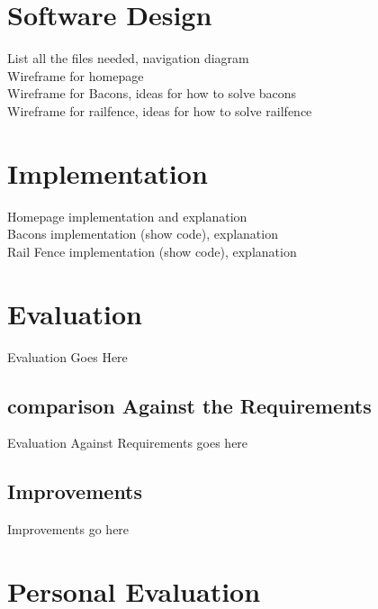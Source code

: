 \documentclass[10pt, a4paper]{article}
\begin{document}
	\section{Software Design}
	List all the files needed, navigation diagram \\ Wireframe for homepage \\ Wireframe for Bacons, ideas for how to solve bacons \\ Wireframe for railfence, ideas for how to solve railfence
	
	
	\section{Implementation}
	Homepage implementation and explanation\\Bacons implementation (show code), explanation \\ Rail Fence implementation (show code), explanation
	
	\section{Evaluation}
	Evaluation Goes Here
	
	\subsection{comparison Against the Requirements}
	Evaluation Against Requirements goes here
	
	\subsection{Improvements}
	Improvements go here
    
    
	\section{Personal Evaluation}
		
	
	
		
\end{document}
